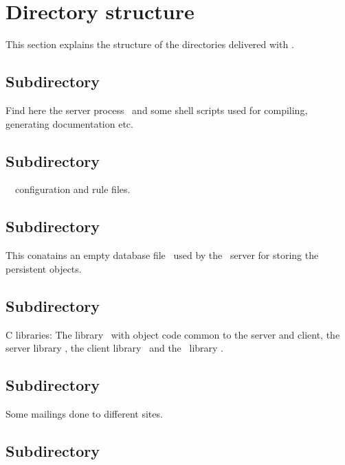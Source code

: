 \section{Directory structure}

This section explains the structure of the directories delivered with
\plobwoexcl.

\subsection*{Subdirectory
  \protect{}}

Find here the server process \ and some shell scripts used
for compiling, generating documentation etc.

\subsection*{Subdirectory
  \protect{}}

\unix\ \ configuration and rule files.

\subsection*{Subdirectory
  \protect{}}

This conatains an empty database file \ used
by the \plob\ server for storing the persistent objects.

\subsection*{Subdirectory
  \protect{}}

C libraries: The library \ with object code common to
the server and client, the server library , the
client library \ and the \postore\ library
.

\subsection*{Subdirectory
  \protect{}}

Some mailings done to different sites.

\subsection*{Subdirectory
  \protect{}}

